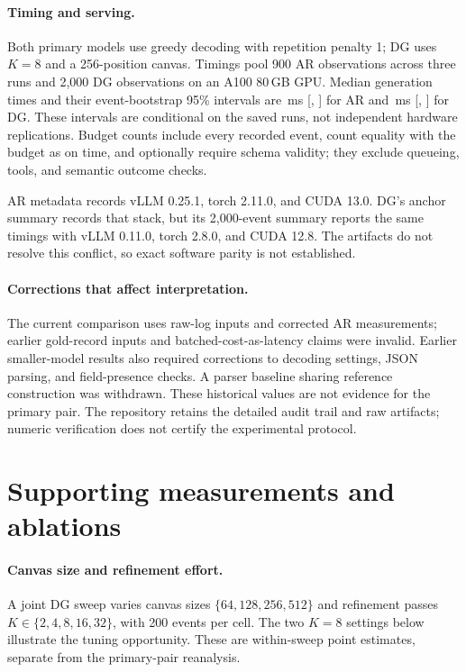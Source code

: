 \paragraph{Timing and serving.}
Both primary models use greedy decoding with repetition penalty 1; DG uses
$K=8$ and a 256-position canvas. Timings pool 900 AR observations across
three runs and 2,000 DG observations on an A100 80\,GB GPU. Median
generation times and their event-bootstrap 95\% intervals are
\arMedian\,ms [\arCiLo, \arCiHi] for AR and
\dgMedian\,ms [\dgCiLo, \dgCiHi] for DG. These intervals are conditional
on the saved runs, not independent hardware replications. Budget counts
include every recorded event, count equality with the budget as on time,
and optionally require schema validity; they exclude queueing, tools,
and semantic outcome checks.

AR metadata records vLLM 0.25.1, torch 2.11.0, and CUDA 13.0. DG's anchor
summary records that stack, but its 2,000-event summary reports the same
timings with vLLM 0.11.0, torch 2.8.0, and CUDA 12.8. The artifacts do
not resolve this conflict, so exact software parity is not established.

\paragraph{Corrections that affect interpretation.}
The current comparison uses raw-log inputs and corrected AR measurements;
earlier gold-record inputs and batched-cost-as-latency claims were invalid.
Earlier smaller-model results also required corrections to decoding settings,
JSON parsing, and field-presence checks. A parser baseline sharing reference
construction was withdrawn. These historical values are not evidence for
the primary pair. The repository retains the detailed audit trail and raw
artifacts; numeric verification does not certify the experimental protocol.

\clearpage
\section{Supporting measurements and ablations}
\label{app:secondary}

\paragraph{Canvas size and refinement effort.}
A joint DG sweep varies canvas sizes $\{64,128,256,512\}$ and refinement
passes $K\in\{2,4,8,16,32\}$, with 200 events per cell. The two
$K=8$ settings below illustrate the tuning opportunity. These are
within-sweep point estimates, separate from the primary-pair reanalysis.


